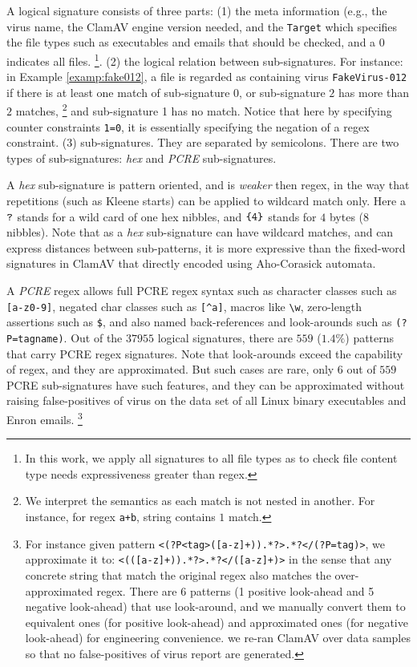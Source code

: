 A logical signature consists of three parts: (1) the meta information
(e.g., the virus name, the ClamAV engine version needed,
and the \texttt{Target} which specifies the file types such as
executables and emails that should
be checked, and a $0$ indicates all files. \footnote{In this work,
we apply all signatures to all file types as to check file content
type needs expressiveness greater than regex.}. (2) the logical 
relation between sub-signatures. For instance: in Example \ref{examp:fake012},
a file is regarded as containing virus \texttt{FakeVirus-012} if
there is at least one match of sub-signature $0$, or sub-signature $2$
has more than $2$ matches, \footnote{We interpret the semantics as
each match is not nested in another. For instance, for regex
\texttt{a+b}, string  contains $1$ match.}
and sub-signature 1 has no match. Notice that here by specifying
counter constraints \texttt{1=0}, it is essentially specifying the
negation of a regex constraint. (3) sub-signatures. They are
separated by semicolons. There are two types of
sub-signatures: {\em hex} and {\em PCRE} sub-signatures.

A {\em hex} sub-signature is pattern oriented, and is {\em weaker}
then regex, in the way that repetitions (such as Kleene starts)
can be applied to wildcard match only. 
Here a $\verb|?|$ stands for a wild card of one hex nibbles, and
$\verb|{4}|$ stands for $4$ bytes (8 nibbles). 
Note that as a {\em hex} sub-signature
can have wildcard matches, and can express distances between
sub-patterns, it is more expressive than the fixed-word
signatures in ClamAV that directly encoded using Aho-Corasick automata.

A {\em PCRE}
regex allows full PCRE regex syntax such as character classes
such as \texttt{[a-z0-9]}, negated char classes such as \texttt{[\^{}a]},
macros like \texttt{\textbackslash w},
zero-length assertions such as \texttt{\${}},
and also named back-references and look-arounds such as
\texttt{(?P=tagname)}.  
Out of the $37955$ logical signatures, there are $559$ ($1.4\%$)
patterns that carry PCRE regex signatures. 
Note that look-arounds exceed the capability of regex,
and they are approximated. But such cases are rare,
only $6$ out of $559$ PCRE sub-signatures have such features,
and they can be approximated without raising false-positives
of virus on the data set of all Linux binary executables and
Enron emails.
\footnote{
For instance given pattern 
\texttt{<(?P<tag>([a-z]+)).*?>.*?</(?P=tag)>},
we approximate it to: \texttt{<(([a-z]+)).*?>.*?</([a-z]+)>}
in the sense that any concrete string that match the original
regex also matches the over-approximated regex.
There are $6$ patterns (1 positive look-ahead and 5 negative look-ahead)
that use look-around, and we manually convert them to equivalent ones (for 
positive look-ahead) and approximated ones (for negative look-ahead)
for engineering convenience. 
we re-ran ClamAV over data samples
so that no false-positives of virus report are generated.
}

